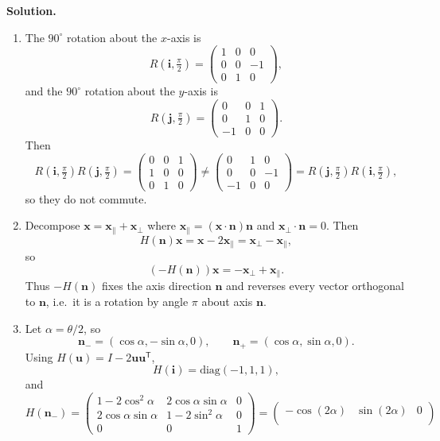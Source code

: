 \documentclass[12pt,a4paper]{article}
\theoremstyle{plain}
\theoremstyle{definition}      %
\begin{document}
\textbf{Solution.}
\begin{enumerate}[label=(\alph*)]
	\item The $90^\circ$ rotation about the $x$-axis is
	\[
	R(\mathbf i,\tfrac{\pi}{2})=
	\begin{pmatrix}
		1&0&0\\
		0&0&-1\\
		0&1&0
	\end{pmatrix},
	\]
	and the $90^\circ$ rotation about the $y$-axis is
	\[
	R(\mathbf j,\tfrac{\pi}{2})=
	\begin{pmatrix}
		0&0&1\\
		0&1&0\\
		-1&0&0
	\end{pmatrix}.
	\]
	Then
	\[
	R(\mathbf i,\tfrac{\pi}{2})R(\mathbf j,\tfrac{\pi}{2})
	=
	\begin{pmatrix}
		0&0&1\\
		1&0&0\\
		0&1&0
	\end{pmatrix}
	\neq
	\begin{pmatrix}
		0&1&0\\
		0&0&-1\\
		-1&0&0
	\end{pmatrix}
	=
	R(\mathbf j,\tfrac{\pi}{2})R(\mathbf i,\tfrac{\pi}{2}),
	\]
	so they do not commute.
	\item Decompose $\mathbf x=\mathbf x_\parallel+\mathbf x_\perp$ where
	$\mathbf x_\parallel=(\mathbf x\cdot\mathbf n)\mathbf n$ and $\mathbf x_\perp\cdot\mathbf n=0$.
	Then
	\[
	H(\mathbf n)\mathbf x=\mathbf x-2\mathbf x_\parallel=\mathbf x_\perp-\mathbf x_\parallel,
	\]
	so
	\[
	(-H(\mathbf n))\mathbf x=-\mathbf x_\perp+\mathbf x_\parallel.
	\]
	Thus $-H(\mathbf n)$ fixes the axis direction $\mathbf n$ and reverses every vector orthogonal to $\mathbf n$, i.e.\ it is a rotation by angle $\pi$ about axis $\mathbf n$.
	\item Let $\alpha=\theta/2$, so
	\[
	\mathbf n_-=(\cos\alpha,-\sin\alpha,0),\qquad \mathbf n_+=(\cos\alpha,\sin\alpha,0).
	\]
	Using $H(\mathbf u)=I-2\mathbf u\mathbf u^{\mathsf T}$,
	\[
	H(\mathbf i)=\mathrm{diag}(-1,1,1),
	\]
	and
	\[
	H(\mathbf n_-)=
	\begin{pmatrix}
		1-2\cos^2\alpha & 2\cos\alpha\sin\alpha & 0\\
		2\cos\alpha\sin\alpha & 1-2\sin^2\alpha & 0\\
		0&0&1
	\end{pmatrix}
	=
	\begin{pmatrix}
		-\cos(2\alpha) & \sin(2\alpha) & 0\\

\end{pmatrix}\]
\end{enumerate}
\end{document}

